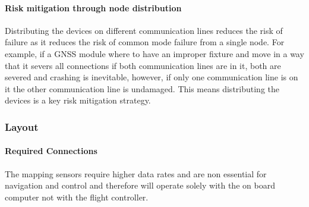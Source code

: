 \paragraph{Risk mitigation through node distribution}
Distributing the devices on different communication lines reduces the risk of failure as it reduces the risk of common mode failure from a single node. For example, if a GNSS module where to have an improper fixture and move in a way that it severs all connections if both communication lines are in it, both are severed and crashing is inevitable, however, if only one communication line is on it the other communication line is undamaged. This means distributing the devices is a key risk mitigation strategy.

\subsubsection{Layout}
\paragraph{Required Connections}
The mapping sensors require higher data rates and are non essential for navigation and control and therefore will operate solely with the on board computer not with the flight controller.

\paragraph{}
